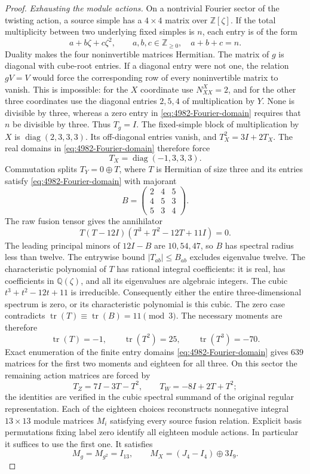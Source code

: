 \begin{proof}
\emph{Exhausting the module actions.}
On a nontrivial Fourier sector of the twisting action, a source
simple has a $4\times4$ matrix over $\mathbb Z[\zeta]$.
If the total multiplicity between two underlying fixed simples is
$n$, each entry is of the form
\begin{equation}
 a+b\zeta+c\zeta^2,\qquad a,b,c\in\mathbb Z_{\geq0},\quad a+b+c=n.
 \label{eq:4982-Fourier-domain}
\end{equation}
Duality makes the four noninvertible matrices Hermitian. The matrix
of $g$ is diagonal with cube-root entries. If a diagonal entry were
not one, the relation $gV=V$ would force the corresponding row of
every noninvertible matrix to vanish. This is impossible: for the
$X$ coordinate use $N_{XX}^X=2$, and for the other three coordinates
use the diagonal entries $2,5,4$ of multiplication by $Y$. None is
divisible by three, whereas a zero entry in \eqref{eq:4982-Fourier-domain} requires that
$n$ be divisible by three. Thus $T_g=I$.
The fixed-simple block of multiplication by $X$ is
$\operatorname{diag}(2,3,3,3)$. Its off-diagonal entries vanish, and
$T_X^2=3I+2T_X$. The real domains in \eqref{eq:4982-Fourier-domain} therefore force
\[
 T_X=\operatorname{diag}(-1,3,3,3).
\]
Commutation splits $T_Y=0\oplus T$, where $T$ is Hermitian of size
three and its entries satisfy \eqref{eq:4982-Fourier-domain} with majorant
\[
 B=\begin{pmatrix}2&4&5\\4&5&3\\5&3&4\end{pmatrix}.
\]
The raw fusion tensor gives the annihilator
\[
 T(T-12I)(T^3+T^2-12T+11I)=0.
\]
The leading principal minors of $12I-B$ are $10,54,47$, so $B$
has spectral radius less than twelve. The entrywise bound
$|T_{ab}|\leq B_{ab}$ excludes eigenvalue twelve.
The characteristic polynomial of $T$ has rational integral
coefficients: it is real, has coefficients in $\mathbb Q(\zeta)$,
and all its eigenvalues are algebraic integers. The cubic
$t^3+t^2-12t+11$ is irreducible. Consequently either the entire
three-dimensional spectrum is zero, or its characteristic polynomial
is this cubic. The zero case contradicts
$\operatorname{tr}(T)\equiv\operatorname{tr}(B)=11\pmod3$.
The necessary moments are therefore
\[
 \operatorname{tr}(T)=-1,\qquad
 \operatorname{tr}(T^2)=25,\qquad
 \operatorname{tr}(T^3)=-70.
\]
Exact enumeration of the finite entry domains \eqref{eq:4982-Fourier-domain} gives $639$
matrices for the first two moments and eighteen for all three.
On this sector the remaining action matrices are forced by
\[
 T_Z=7I-3T-T^2,\qquad T_W=-8I+2T+T^2;
\]
the identities are verified in the cubic spectral summand of the
original regular representation. Each of the eighteen choices
reconstructs nonnegative integral $13\times13$ module matrices
$M_i$ satisfying every source fusion relation. Explicit basis
permutations fixing label zero identify all eighteen module actions.
In particular it suffices to use the first one. It satisfies
\[
 M_g=M_{g^2}=I_{13},\qquad
 M_X=(J_4-I_4)\oplus3I_9.
\]


\end{proof}
